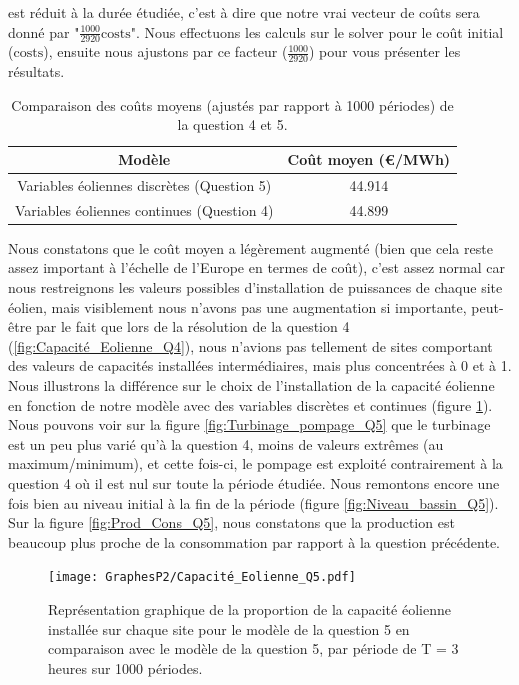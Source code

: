 \documentclass{article}
\begin{document}
est réduit à la durée étudiée, c'est à dire que notre vrai vecteur de coûts sera donné par "$\frac{1000}{2920} \mathrm{costs}$".
Nous effectuons les calculs sur le solver pour le coût initial ($\mathrm{costs}$), ensuite nous ajustons 
par ce facteur ($\frac{1000}{2920}$) pour vous présenter les résultats.
\begin{table}[H]
    \centering
    \renewcommand{\arraystretch}{1.5}%
    \begin{tabular}{|c | c |} 
        \hline
        Modèle & Coût moyen (€/MWh) \\
        \hline
        Variables éoliennes discrètes (Question 5) & 44.914 \\
        \hline
        Variables éoliennes continues (Question 4) & 44.899 \\
        \hline
    \end{tabular}
    \caption{Comparaison des coûts moyens (ajustés par rapport à 1000 périodes) de la question 4 et 5.}
    \label{table:comparaison_resultat_Q5_Q4_1000}
\end{table} 
\noindent Nous constatons que le coût moyen a légèrement augmenté (bien que cela reste assez important à l'échelle
de l'Europe en termes de coût), c'est assez normal car nous restreignons les valeurs possibles d'installation 
de puissances de chaque site éolien, mais visiblement nous n'avons pas une augmentation si importante, peut-être par le fait 
que lors de la résolution de la question 4 (\autoref{fig:Capacité_Eolienne_Q4}), nous n'avions pas tellement de sites
comportant des valeurs de capacités installées intermédiaires, mais plus concentrées à 0 et à 1. Nous illustrons la différence sur le choix de l'installation 
de la capacité éolienne en fonction de notre modèle avec des variables discrètes et continues (figure \ref{fig:Capacité_Eolienne_Q5}). Nous pouvons voir sur la figure \ref{fig:Turbinage_pompage_Q5} que le turbinage est un peu plus varié qu'à la question 4, moins de valeurs extrêmes (au maximum/minimum), et cette fois-ci,
le pompage est exploité contrairement à la question 4 où il est nul sur toute la période étudiée. 
Nous remontons encore une fois bien au niveau initial à la fin de la période (figure \ref{fig:Niveau_bassin_Q5}).  
Sur la figure \ref{fig:Prod_Cons_Q5}, nous constatons que la production est beaucoup plus proche de la consommation par rapport à la question précédente.
\begin{figure}[h!]
    \centering
    \texttt{[image: GraphesP2/Capacité\_Eolienne\_Q5.pdf]}
    \caption{Représentation graphique de la proportion de la capacité éolienne installée sur chaque site pour le modèle de la question 5 en comparaison
    avec le modèle de la question 5, par période
    de T = 3 heures sur 1000 périodes.}
    \label{fig:Capacité_Eolienne_Q5}
\end{figure}
\end{document}
